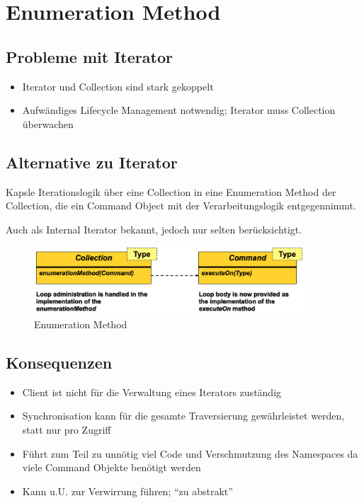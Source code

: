 \section{Enumeration Method}

\subsection*{Probleme mit Iterator}

\begin{itemize}
	\item Iterator und Collection sind stark gekoppelt
	\item Aufwändiges Lifecycle Management notwendig; Iterator muss Collection überwachen
\end{itemize}

\subsection*{Alternative zu Iterator}

Kapsle Iterationslogik über eine Collection in eine Enumeration Method der Collection, die ein Command Object mit der Verarbeitungslogik entgegennimmt.

Auch als Internal Iterator bekannt, jedoch nur selten berücksichtigt.

\begin{figure}[H]
	\centering
	\includegraphics[width=0.9\textwidth]{content/advancedPatterns/images/enumerationmethod.png}
	\caption{Enumeration Method}
\end{figure}

\subsection*{Konsequenzen}

\begin{itemize}
	\item Client ist nicht für die Verwaltung eines Iterators zuständig
	\item Synchronisation kann für die gesamte Traversierung gewährleistet werden, statt nur pro Zugriff
	\item Führt zum Teil zu unnötig viel Code und Verschmutzung des Namespaces da viele Command Objekte benötigt werden
	\item Kann u.U. zur Verwirrung führen; ``zu abstrakt''
\end{itemize}


